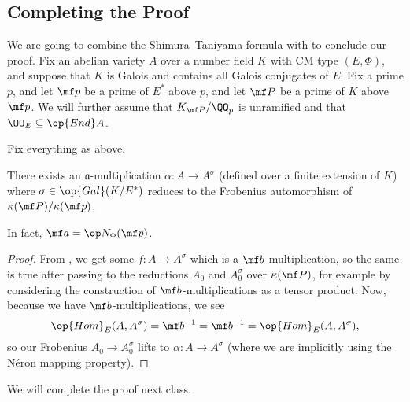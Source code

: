 \documentclass[../notes.tex]{subfiles}
\begin{document}
\subsection{Completing the Proof}
We are going to combine the Shimura--Taniyama formula with  to conclude our proof. Fix an abelian variety $A$ over a number field $K$ with CM type $(E,\Phi)$, and suppose that $K$ is Galois and contains all Galois conjugates of $E$. Fix a prime $p$, and let $\mf p$ be a prime of $E^*$ above $p$, and let $\mf P$ be a prime of $K$ above $\mf p$. We will further assume that $K_{\mf P}/\QQ_p$ is unramified and that $\OO_E\subseteq\op{End}A$.
\begin{corollary}
	Fix everything as above.
	\begin{listalph}
		\item There exists an $\mathfrak a$-multiplication $\alpha\colon A\to A^\sigma$ (defined over a finite extension of $K$) where $\sigma\in\op{Gal}(K/E^*)$ reduces to the Frobenius automorphism of $\kappa(\mf P)/\kappa(\mf p)$.
		\item In fact, $\mf a=\op N_\Phi(\mf p)$.
	\end{listalph}
\end{corollary}
\begin{proof}
	From , we get some $f\colon A\to A^\sigma$ which is a $\mf b$-multiplication, so the same is true after passing to the reductions $A_0$ and $A_0^\sigma$ over $\kappa(\mf P)$, for example by considering the construction of $\mf b$-multiplications as a tensor product. Now, because we have $\mf b$-multiplications, we see
	\[\op{Hom}_E(A,A^\sigma)=\mf b^{-1}=\mf b^{-1}=\op{Hom}_E(A,A^\sigma),\]
	so our Frobenius $A_0\to A_0^\sigma$ lifts to $\alpha\colon A\to A^\sigma$ (where we are implicitly using the N\'eron mapping property).
\end{proof}
We will complete the proof next class.
\end{document}
